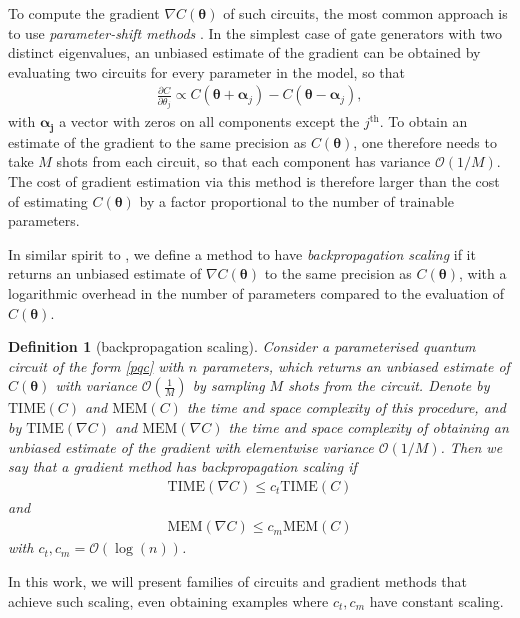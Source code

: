 \documentclass[a4paper,twocolumn,11pt,accepted=2025-09-06]{quantumarticle}
\newtheorem{definition}{Definition}[section]
\renewcommand{\vec}{\boldsymbol}
\begin{document}
To compute the gradient $\nabla C(\vec{\theta})$ of such circuits, the most common approach is to use \emph{parameter-shift methods} \cite{PS0, PS1, PS2, PS3, PS4, PS5}. In the simplest case of gate generators with two distinct eigenvalues, an unbiased estimate of the gradient can be obtained by evaluating two circuits for every parameter in the model, so that 
\begin{align}
\frac{\partial C}{\partial \theta_j}\propto C(\vec{\theta}+\vec{\alpha}_j)-C(\vec{\theta}-\vec{\alpha}_j),
\end{align}
with $\vec{\alpha_j}$ a vector with zeros on all components except the $j^{\text{th}}$. To obtain an estimate of the gradient to the same precision as $C(\vec{\theta})$, one therefore needs to take $M$ shots from each circuit, so that each component has variance  $\mathcal{O}(1/M)$. The cost of gradient estimation via this method is therefore larger than the cost of estimating $C(\vec{\theta})$ by a factor proportional to the number of trainable parameters. 

In similar spirit to \cite{abbas2023quantum}, we define a method to have \emph{backpropagation scaling} if it returns an unbiased estimate of $\nabla C(\vec{\theta})$ to the same precision as $C(\vec{\theta})$, 
with a logarithmic overhead in the number of parameters compared to the evaluation of $C(\vec{\theta})$. 


\begin{definition}[backpropagation scaling]
    Consider a parameterised quantum circuit of the form \eqref{pqc} with $n$ parameters, which returns an unbiased estimate of $C(\vec{\theta})$ with variance $\mathcal{O}(\frac{1}{M})$ by sampling $M$ shots from the circuit. Denote by $\text{TIME}(C)$ and $\text{MEM}(C)$ the time and space complexity of this procedure, and by $\text{TIME}(\nabla C)$ and $\text{MEM}(\nabla C)$ the time and space complexity of obtaining an unbiased estimate of the gradient with elementwise variance $\mathcal{O}(1/M)$.
    Then we say that a gradient method has backpropagation scaling if 
    \begin{align}
        \text{TIME}(\nabla C)\leq c_t \text{TIME}(C)
    \end{align}
    and 
    \begin{align}
        \text{MEM}(\nabla C)\leq c_m \text{MEM}(C)
    \end{align}
    with $c_t,c_m= \mathcal{O}(\log(n))$.
\end{definition}

In this work, we will present families of circuits and gradient methods that achieve such scaling, even obtaining examples where $c_t,c_m$ have constant scaling. 
\end{document}
